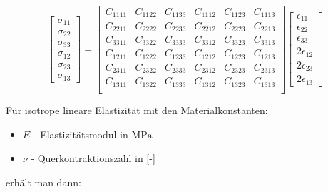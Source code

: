 \begin{equation}
\label{generalHook2}
\begin{bmatrix} 
\sigma_{11} \\
\sigma_{22} \\
\sigma_{33} \\
\sigma_{12} \\
\sigma_{23} \\
\sigma_{13} 
\end{bmatrix} = \begin{bmatrix}
C_{1111} & C_{1122} & C_{1133} & C_{1112} & C_{1123} & C_{1113} \\
C_{2211} & C_{2222} & C_{2233} & C_{2212} & C_{2223} & C_{2213} \\
C_{3311} & C_{3322} & C_{3333} & C_{3312} & C_{3323} & C_{3313} \\
C_{1211} & C_{1222} & C_{1233} & C_{1212} & C_{1223} & C_{1213} \\
C_{2311} & C_{2322} & C_{2333} & C_{2312} & C_{2323} & C_{2313} \\
C_{1311} & C_{1322} & C_{1333} & C_{1312} & C_{1323} & C_{1313} \\ 
\end{bmatrix} \begin{bmatrix} \epsilon_{11} \\ \epsilon_{22} \\ \epsilon_{33} \\ 2\epsilon_{12} \\ 2\epsilon_{23} \\ 2\epsilon_{13} \end{bmatrix}
\end{equation}

Für isotrope lineare Elastizität mit den Materialkonstanten:

\begin{itemize}
\item $E$ - Elastizitätsmodul in $\text{MPa}$
\item $\nu$ - Querkontraktionszahl in [-]
\end{itemize}

erhält man dann:

